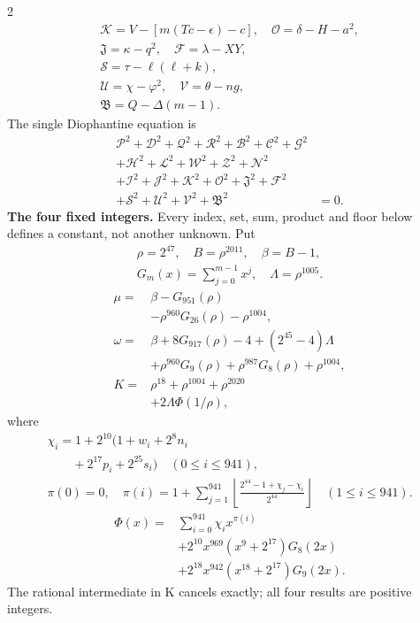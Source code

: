 \documentclass[10pt]{article}
\newcommand{\fl}[1]{\left\lfloor#1\right\rfloor}
\begin{document}
\begin{multicols}{2}
\[\begin{gathered}
\mathcal{K}=V-[m(Tc-\epsilon)-c],\quad\mathcal{O}=\delta-H-a^2,\\
\mathfrak{J}=\kappa-q^2,\quad\mathcal{F}=\lambda-XY,\\
\mathcal{S}=\tau-\ell(\ell+k),\\
\mathcal{U}=\chi-\varphi^2,\quad\mathcal{V}=\theta-ng,\\
\mathfrak{B}=Q-\Delta(m-1).
\end{gathered}
\]
The single Diophantine equation is
\[
\begin{split}
\mathcal{P}^2+\mathcal{D}^2+\mathcal{Q}^2+\mathcal{R}^2+\mathcal{B}^2+\mathcal{C}^2+\mathcal{G}^2 &\\
+\mathcal{H}^2+\mathcal{L}^2+\mathcal{W}^2+\mathcal{Z}^2+\mathcal{N}^2 &\\
+\mathcal{I}^2+\mathcal{J}^2+\mathcal{K}^2+\mathcal{O}^2+\mathfrak{J}^2+\mathcal{F}^2 &\\
+\mathcal{S}^2+\mathcal{U}^2+\mathcal{V}^2+\mathfrak{B}^2 &= 0.
\end{split}
\]
\textbf{The four fixed integers.}
Every index, set, sum, product and floor below defines a constant, not
another unknown. Put
\[
\begin{gathered}
\rho=2^{47},\quad B=\rho^{2011},\quad\beta=B-1,\\
G_m(x)=\sum_{j=0}^{m-1}x^j,\quad
\Lambda=\rho^{1005}.
\end{gathered}
\]
\begin{align*}
\mu={}&\beta-G_{951}(\rho)\\
&-\rho^{960}G_{26}(\rho)-\rho^{1004},\\
\omega={}&\beta+8G_{917}(\rho)-4+(2^{45}-4)\Lambda\\
&+\rho^{960}G_9(\rho)+\rho^{987}G_8(\rho)
  +\rho^{1004},\\
K={}&\rho^{18}+\rho^{1004}+\rho^{2020}\\
&+2\Lambda\Phi(1/\rho),
\end{align*}
where
\[
\begin{gathered}
\chi_i=1+2^{10}(1+w_i+2^8n_i\\
\qquad+2^{17}p_i+2^{25}s_i)\quad(0\le i\le941),\\
\pi(0)=0,\quad\pi(i)=1+\sum_{j=1}^{941}
\fl{\frac{2^{44}-1+\chi_j-\chi_i}{2^{44}}}\quad(1\le i\le941).
\end{gathered}
\]
\[
\begin{split}
\Phi(x)={}&\sum_{i=0}^{941}\chi_i x^{\pi(i)}\\
&+2^{10}x^{969}(x^9+2^{17})G_8(2x)\\
&+2^{18}x^{942}(x^{18}+2^{17})G_9(2x).
\end{split}
\]
The rational intermediate in K cancels exactly; all four results are positive integers.


\end{multicols}
\end{document}
